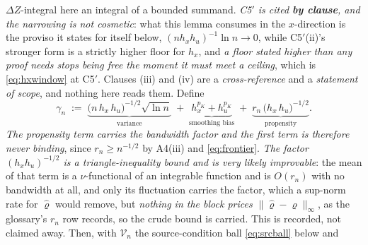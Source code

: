 \begin{lemma}
$\Delta Z$-integral here an integral of a bounded summand.
\emph{C5$'$ is cited \textbf{by clause}, and the narrowing is not cosmetic}: what this lemma consumes in
the $x$-direction
is the proviso it states for itself below, $(nh_xh_u)^{-1}\ln n\to0$, while C5$'$(ii)'s stronger form is
a strictly higher floor for $h_x$, and \emph{a floor stated higher than any proof needs stops being free the
moment it must meet a ceiling}, which is \eqref{eq:hxwindow} at C5$'$. Clauses (iii) and (iv) are a
\emph{cross-reference} and a \emph{statement of scope}, and nothing here reads them.
Define
\begin{equation}\label{eq:gamman}
\gamma_n\;:=\;\underbrace{\big(n\,h_x\,h_u\big)^{-1/2}\sqrt{\ln n}}_{\text{variance}}
\;+\;\underbrace{h_x^{p_K}+h_u^{p_K}}_{\text{smoothing bias}}
\;+\;\underbrace{r_n\,\big(h_x\,h_u\big)^{-1/2}}_{\text{propensity}} .
\end{equation}
\emph{The propensity term carries the bandwidth factor and the first term is therefore never binding},
since $r_n\ge n^{-1/2}$ by A4(iii) and \eqref{eq:frontier}. \emph{The factor $(h_xh_u)^{-1/2}$ is a
triangle-inequality bound and is very likely improvable}: the mean of that term is a $\nu$-functional
of an integrable function and is $O(r_n)$ with no bandwidth at all, and only its fluctuation carries
the factor, which a sup-norm rate for $\hat\varrho$ would remove, but \emph{nothing in the block
prices $\|\hat\varrho-\varrho\|_\infty$}, as the glossary's $r_n$ row records, so the crude bound is
carried. This is recorded, not claimed away.
Then, with $\mathcal V_n$ the source-condition ball \eqref{eq:srcball} below and

\end{lemma}
